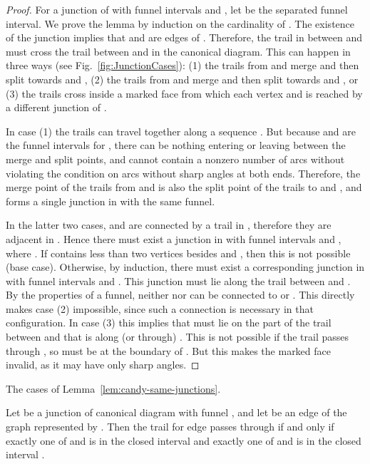 \documentclass{llncs}
\begin{document}
\begin{proof}
For a junction  of  with funnel intervals  and , let  be the separated funnel interval. We prove the lemma by induction on the cardinality of . The existence of the junction implies that  and  are edges of . Therefore, the trail in  between  and  must cross the trail between  and  in the canonical diagram. This can happen in three ways (see Fig.~\ref{fig:JunctionCases}): (1) the trails from  and  merge and then split towards  and , (2) the trails from  and  merge and then split towards  and , or (3) the trails cross inside a marked face  from which each vertex  and  is reached by a different junction of .

In case (1) the trails can travel together along a sequence . But because  and  are the funnel intervals for , there can be nothing entering or leaving  between the merge and split points, and  cannot contain a nonzero number of arcs without violating the condition on arcs without sharp angles at both ends. Therefore, the merge point of the trails from  and  is also the split point of the trails to  and , and forms a single junction  in  with the same funnel.

In the latter two cases,  and  are connected by a trail in , therefore they are adjacent in .
Hence there must exist a junction  in  with funnel intervals  and , where . If  contains less than two vertices besides  and , then this is not possible (base case). Otherwise, by induction, there must exist a corresponding junction  in  with funnel intervals  and .
This junction must lie along the trail between  and . By the properties of a funnel, neither  nor  can be connected to  or . This directly makes case (2) impossible, since such a connection is necessary in that configuration. In case (3) this implies that  must lie on the part of the trail between  and  that is along (or through) . This is not possible if the trail passes through , so  must be at the boundary of . But this makes the marked face  invalid, as it may have only sharp angles.
\end{proof}

 {The cases of Lemma~\ref{lem:candy-same-junctions}.}

\begin{lemma}
\label{lem:trail-thru-junction}
Let  be a junction of canonical diagram  with funnel , and let  be an
edge of the graph  represented by . Then the trail for edge  passes through  if and only if
exactly one of  and  is in the closed interval  and exactly one
of  and  is in the closed interval .
\end{lemma}
\end{document}
